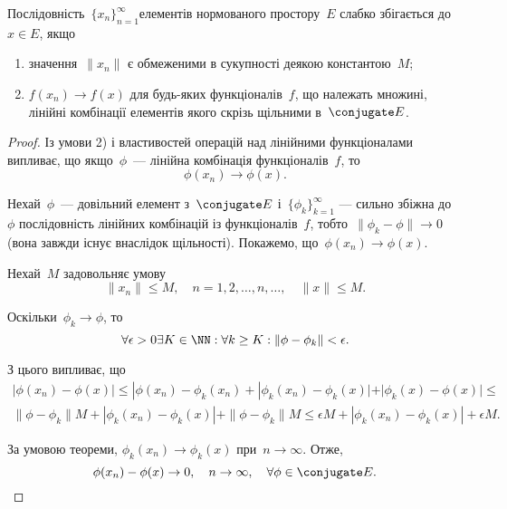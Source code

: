 \begin{theorem}
Послідовність~$\{x_n\}_{n = 1}^\infty$елементів
нормованого простору~$E$ слабко збігається до~$x \in E$, якщо
\begin{enumerate}
\item значення~$\|x_n\|$ є обмеженими в сукупності деякою
константою~$M$;
\item $f(x_n) \to f(x)$ для будь-яких функціоналів~$f$, що
належать множині, лінійні комбінації елементів якого скрізь
щільними в~$\conjugate E$.
\end{enumerate}
\end{theorem}

\begin{proof}
Із умови 2) і властивостей операцій над
лінійними функціоналами випливає, що якщо~$\phi$~--- лінійна
комбінація функціоналів~$f$, то
\begin{equation*}
    \phi(x_n) \to \phi(x).
\end{equation*}

Нехай~$\phi$~--- довільний елемент з~$\conjugate E$ і~$\{\phi_k\}_{k = 1}^\infty$
--- сильно збіжна до~$\phi$ послідовність лінійних комбінацій із
функціоналів~$f$, тобто~$\|\phi_k - \phi\| \to 0$ (вона завжди існує
внаслідок щільності). Покажемо, що~$\phi(x_n) \to \phi(x)$.

Нехай~$M$ задовольняє умову
\begin{equation*}
    \|x_n\| \le M, \quad n = 1, 2, \dots, n, \dots, \quad \|x\| \le M.
\end{equation*}

Оскільки~$\phi_k \to \phi$, то
\begin{equation*}
    \forall \epsilon > 0 \exists K \in \NN:
    \forall k \ge K: \|\phi - \phi_k\| < \epsilon.
\end{equation*}

З цього випливає, що
\begin{multline*}
    |\phi(x_n) - \phi(x)| \le
    |\phi(x_n) - \phi_k(x_n) +
    |\phi_k(x_n) - \phi_k(x)| +
    |\phi_k(x) - \phi(x)| \le \\
    \|\phi - \phi_k\| M +
    |\phi_k(x_n) - \phi_k(x)| +
    \|\phi - \phi_k\| M \le 
    \epsilon M + 
    |\phi_k(x_n) - \phi_k(x)| +
    \epsilon M.
\end{multline*}

За умовою теореми, $\phi_k(x_n) \to \phi_k(x)$ при~$n \to \infty$. Отже,
\begin{equation*}
    \phi(x_n) - \phi(x) \to 0, \quad n \to \infty, \quad \forall \phi \in \conjugate E. \qedhere
\end{equation*}
\end{proof}

